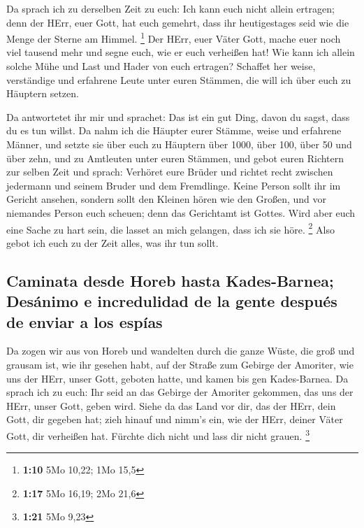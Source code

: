  Da sprach ich zu derselben Zeit zu euch: Ich kann euch
nicht allein ertragen;  denn der HErr, euer Gott, hat
euch gemehrt, dass ihr heutigestages seid wie die Menge der Sterne am
Himmel. \footnote{\textbf{1:10} 5Mo 10,22; 1Mo 15,5}  Der
HErr, euer Väter Gott, mache euer noch viel tausend mehr und segne euch,
wie er euch verheißen hat!  Wie kann ich allein solche
Mühe und Last und Hader von euch ertragen?  Schaffet her
weise, verständige und erfahrene Leute unter euren Stämmen, die will ich
über euch zu Häuptern setzen.

 Da antwortetet ihr mir und sprachet: Das ist ein gut
Ding, davon du sagst, dass du es tun willst.  Da nahm ich
die Häupter eurer Stämme, weise und erfahrene Männer, und setzte sie
über euch zu Häuptern über 1000, über 100, über 50 und über zehn, und zu
Amtleuten unter euren Stämmen,  und gebot euren Richtern
zur selben Zeit und sprach: Verhöret eure Brüder und richtet recht
zwischen jedermann und seinem Bruder und dem Fremdlinge. 
Keine Person sollt ihr im Gericht ansehen, sondern sollt den Kleinen
hören wie den Großen, und vor niemandes Person euch scheuen; denn das
Gerichtamt ist Gottes. Wird aber euch eine Sache zu hart sein, die
lasset an mich gelangen, dass ich sie höre. \footnote{\textbf{1:17} 5Mo
  16,19; 2Mo 21,6}  Also gebot ich euch zu der Zeit
alles, was ihr tun sollt.

\hypertarget{caminata-desde-horeb-hasta-kades-barnea-desuxe1nimo-e-incredulidad-de-la-gente-despuuxe9s-de-enviar-a-los-espuxedas}{%
\subsection{Caminata desde Horeb hasta Kades-Barnea; Desánimo e
incredulidad de la gente después de enviar a los
espías}\label{caminata-desde-horeb-hasta-kades-barnea-desuxe1nimo-e-incredulidad-de-la-gente-despuuxe9s-de-enviar-a-los-espuxedas}}

 Da zogen wir aus von Horeb und wandelten durch die ganze
Wüste, die groß und grausam ist, wie ihr gesehen habt, auf der Straße
zum Gebirge der Amoriter, wie uns der HErr, unser Gott, geboten hatte,
und kamen bis gen Kades-Barnea.  Da sprach ich zu euch:
Ihr seid an das Gebirge der Amoriter gekommen, das uns der HErr, unser
Gott, geben wird.  Siehe da das Land vor dir, das der
HErr, dein Gott, dir gegeben hat; zieh hinauf und nimm's ein, wie der
HErr, deiner Väter Gott, dir verheißen hat. Fürchte dich nicht und lass
dir nicht grauen. \footnote{\textbf{1:21} 5Mo 9,23}

